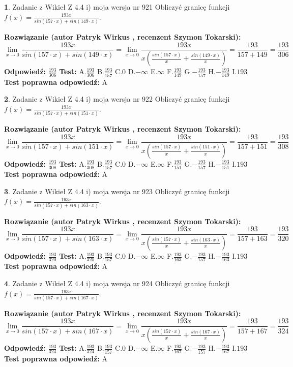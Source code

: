 \documentclass[12pt, a4paper]{article}
\theoremstyle{definition} %
\newtheorem{zad}{}
\newcommand{\zadStart}[1]{\begin{zad}#1\newline}
\newcommand{\zadStop}{\end{zad}}
\newcommand{\rozwStart}[2]{\noindent \textbf{Rozwiązanie (autor #1 , recenzent #2): }\newline}
\newcommand{\rozwStop}{\newline}
\newcommand{\odpStart}{\noindent \textbf{Odpowiedź:}\newline}
\newcommand{\odpStop}{\newline}
\newcommand{\testStart}{\noindent \textbf{Test:}\newline}
\newcommand{\testStop}{\newline}
\newcommand{\kluczStart}{\noindent \textbf{Test poprawna odpowiedź:}\newline}
\newcommand{\kluczStop}{\newline}
\begin{document}
\zadStart{Zadanie z Wikieł Z 4.4 i) moja wersja nr 921}
Obliczyć granicę funkcji $f(x)=\frac{193x}{sin(157\cdot x) +sin(149\cdot x)}$.
\zadStop
\rozwStart{Patryk Wirkus}{Szymon Tokarski}
$$\lim\limits_{x\to 0}\frac{193x}{sin(157\cdot x) +sin(149\cdot x)}=\lim\limits_{x\to 0}\frac{193x}{x(\frac{sin(157\cdot x)}{x}+\frac{sin(149\cdot x)}{x})}=\frac{193}{157+149} = \frac{193}{306}$$
\rozwStop
\odpStart
$\frac{193}{306}$
\odpStop
\testStart
A.$\frac{193}{306}$
B.$\frac{193}{157}$
C.$0$
D.$-\infty$
E.$\infty$
F.$\frac{193}{149}$
G.$-\frac{193}{157}$
H.$-\frac{193}{149}$
I.$193$
\testStop
\kluczStart
A
\kluczStop



\zadStart{Zadanie z Wikieł Z 4.4 i) moja wersja nr 922}
Obliczyć granicę funkcji $f(x)=\frac{193x}{sin(157\cdot x) +sin(151\cdot x)}$.
\zadStop
\rozwStart{Patryk Wirkus}{Szymon Tokarski}
$$\lim\limits_{x\to 0}\frac{193x}{sin(157\cdot x) +sin(151\cdot x)}=\lim\limits_{x\to 0}\frac{193x}{x(\frac{sin(157\cdot x)}{x}+\frac{sin(151\cdot x)}{x})}=\frac{193}{157+151} = \frac{193}{308}$$
\rozwStop
\odpStart
$\frac{193}{308}$
\odpStop
\testStart
A.$\frac{193}{308}$
B.$\frac{193}{157}$
C.$0$
D.$-\infty$
E.$\infty$
F.$\frac{193}{151}$
G.$-\frac{193}{157}$
H.$-\frac{193}{151}$
I.$193$
\testStop
\kluczStart
A
\kluczStop



\zadStart{Zadanie z Wikieł Z 4.4 i) moja wersja nr 923}
Obliczyć granicę funkcji $f(x)=\frac{193x}{sin(157\cdot x) +sin(163\cdot x)}$.
\zadStop
\rozwStart{Patryk Wirkus}{Szymon Tokarski}
$$\lim\limits_{x\to 0}\frac{193x}{sin(157\cdot x) +sin(163\cdot x)}=\lim\limits_{x\to 0}\frac{193x}{x(\frac{sin(157\cdot x)}{x}+\frac{sin(163\cdot x)}{x})}=\frac{193}{157+163} = \frac{193}{320}$$
\rozwStop
\odpStart
$\frac{193}{320}$
\odpStop
\testStart
A.$\frac{193}{320}$
B.$\frac{193}{157}$
C.$0$
D.$-\infty$
E.$\infty$
F.$\frac{193}{163}$
G.$-\frac{193}{157}$
H.$-\frac{193}{163}$
I.$193$
\testStop
\kluczStart
A
\kluczStop



\zadStart{Zadanie z Wikieł Z 4.4 i) moja wersja nr 924}
Obliczyć granicę funkcji $f(x)=\frac{193x}{sin(157\cdot x) +sin(167\cdot x)}$.
\zadStop
\rozwStart{Patryk Wirkus}{Szymon Tokarski}
$$\lim\limits_{x\to 0}\frac{193x}{sin(157\cdot x) +sin(167\cdot x)}=\lim\limits_{x\to 0}\frac{193x}{x(\frac{sin(157\cdot x)}{x}+\frac{sin(167\cdot x)}{x})}=\frac{193}{157+167} = \frac{193}{324}$$
\rozwStop
\odpStart
$\frac{193}{324}$
\odpStop
\testStart
A.$\frac{193}{324}$
B.$\frac{193}{157}$
C.$0$
D.$-\infty$
E.$\infty$
F.$\frac{193}{167}$
G.$-\frac{193}{157}$
H.$-\frac{193}{167}$
I.$193$
\testStop
\kluczStart
A
\kluczStop
\end{document}
